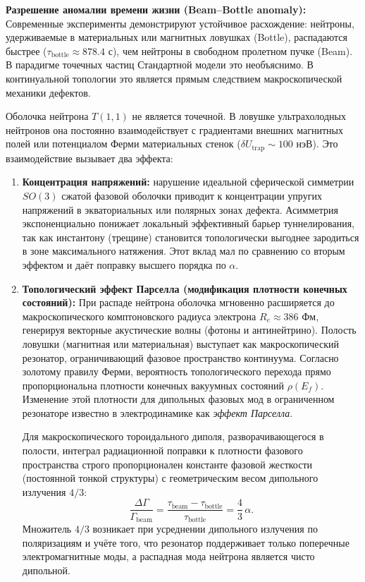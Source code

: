 \documentclass[11pt,a4paper]{article}
\begin{document}
\textbf{Разрешение аномалии времени жизни (Beam–Bottle anomaly):}
Современные эксперименты демонстрируют устойчивое расхождение: нейтроны, удерживаемые в материальных или магнитных ловушках (Bottle), распадаются быстрее ($\tau_{\text{bottle}} \approx 878.4$ с), чем нейтроны в свободном пролетном пучке (Beam). В парадигме точечных частиц Стандартной модели это необъяснимо. В континуальной топологии это является прямым следствием макроскопической механики дефектов.

Оболочка нейтрона $T(1,1)$ не является точечной. В ловушке ультрахолодных нейтронов она постоянно взаимодействует с градиентами внешних магнитных полей или потенциалом Ферми материальных стенок ($\delta U_{\text{trap}} \sim 100$ нэВ). Это взаимодействие вызывает два эффекта:

\begin{enumerate}
	\item \textbf{Концентрация напряжений:} нарушение идеальной сферической симметрии $SO(3)$ сжатой фазовой оболочки приводит к концентрации упругих напряжений в экваториальных или полярных зонах дефекта. Асимметрия экспоненциально понижает локальный эффективный барьер туннелирования, так как инстантону (трещине) становится топологически выгоднее зародиться в зоне максимального натяжения. Этот вклад мал по сравнению со вторым эффектом и даёт поправку высшего порядка по $\alpha$.
	
	\item \textbf{Топологический эффект Парселла (модификация плотности конечных состояний):} При распаде нейтрона оболочка мгновенно расширяется до макроскопического комптоновского радиуса электрона $R_e \approx 386$ Фм, генерируя векторные акустические волны (фотоны и антинейтрино). Полость ловушки (магнитная или материальная) выступает как макроскопический резонатор, ограничивающий фазовое пространство континуума. Согласно золотому правилу Ферми, вероятность топологического перехода прямо пропорциональна плотности конечных вакуумных состояний $\rho(E_f)$. Изменение этой плотности для дипольных фазовых мод в ограниченном резонаторе известно в электродинамике как \textit{эффект Парселла}. 
	
	Для макроскопического тороидального диполя, разворачивающегося в полости, интеграл радиационной поправки к плотности фазового пространства строго пропорционален константе фазовой жесткости (постоянной тонкой структуры) с геометрическим весом дипольного излучения $4/3$:
	\begin{equation}
		\frac{\Delta \Gamma}{\Gamma_{\text{beam}}} = \frac{\tau_{\text{beam}} - \tau_{\text{bottle}}}{\tau_{\text{bottle}}} = \frac{4}{3}\,\alpha.
	\end{equation}
	Множитель $4/3$ возникает при усреднении дипольного излучения по поляризациям и учёте того, что резонатор поддерживает только поперечные электромагнитные моды, а распадная мода нейтрона является чисто дипольной.
\end{enumerate}
\end{document}
